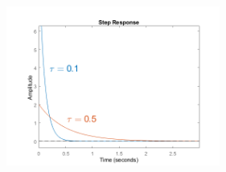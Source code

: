 \documentclass[
  10pt,
  a4paper,
  twocolumn]{article}
\numberwithin{equation}{section}
\begin{document}
\begin{figure}[H]

{\centering \includegraphics[width=7cm,height=\textheight]{images/paste-24.png}

}

\end{figure}
\end{document}
